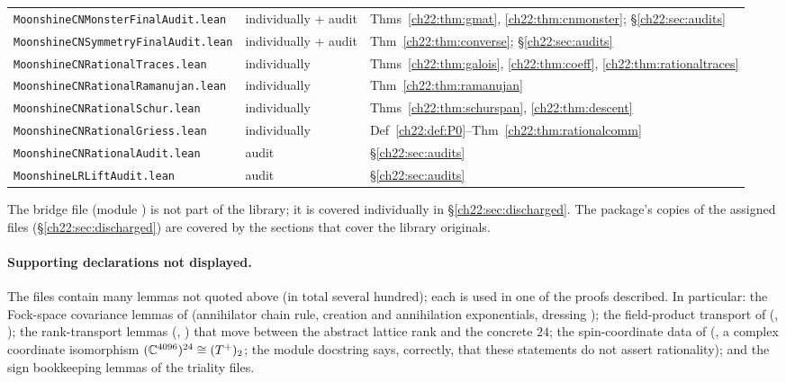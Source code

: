 \begin{center}
\begin{longtable}{p{}p{}p{}}
\texttt{MoonshineCNMonsterFinalAudit.lean} & individually + audit & Thms~\ref{ch22:thm:gmat}, \ref{ch22:thm:cnmonster}; \S\ref{ch22:sec:audits}\\
\texttt{MoonshineCNSymmetryFinalAudit.lean} & individually + audit & Thm~\ref{ch22:thm:converse}; \S\ref{ch22:sec:audits}\\
\texttt{MoonshineCNRationalTraces.lean} & individually & Thms~\ref{ch22:thm:galois}, \ref{ch22:thm:coeff}, \ref{ch22:thm:rationaltraces}\\
\texttt{MoonshineCNRationalRamanujan.lean} & individually & Thm~\ref{ch22:thm:ramanujan}\\
\texttt{MoonshineCNRationalSchur.lean} & individually & Thms~\ref{ch22:thm:schurspan}, \ref{ch22:thm:descent}\\
\texttt{MoonshineCNRationalGriess.lean} & individually & Def~\ref{ch22:def:P0}--Thm~\ref{ch22:thm:rationalcomm}\\
\texttt{MoonshineCNRationalAudit.lean} & audit & \S\ref{ch22:sec:audits}\\
\texttt{MoonshineLRLiftAudit.lean} & audit & \S\ref{ch22:sec:audits}\\
\bottomrule
\end{longtable}
\end{center}
The bridge file  (module
) is not part of the library; it is covered individually in
\S\ref{ch22:sec:discharged}.  The package's copies of the assigned files (\S\ref{ch22:sec:discharged}) are covered by the
sections that cover the library originals.

\paragraph{Supporting declarations not displayed.}  The files contain many lemmas not quoted above (in total several hundred);
each is used in one of the proofs described.  In particular: the Fock-space covariance lemmas of
 (annihilator chain rule, creation and annihilation exponentials, dressing
); the field-product transport of  (,
); the rank-transport lemmas (, ) that move between
the abstract lattice rank and the concrete $24$; the spin-coordinate data of 
(, a complex coordinate isomorphism $({\mathbb{C}}^{4096})^{24}\cong(T^+)_2$; the module docstring says, correctly, that
these statements do not assert rationality); and the sign bookkeeping lemmas of the triality files.

